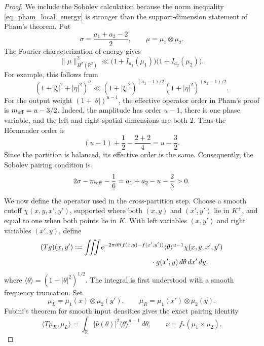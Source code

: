 \documentclass[11pt]{article}
\begin{document}
\begin{proof}
We include the Sobolev calculation because the norm inequality
\eqref{eq_pham_local_energy} is stronger than the support-dimension
statement of Pham's theorem.  Put
\[
 \sigma=\frac{a_1+a_2-2}{2},
 \qquad \mu=\mu_1\otimes\mu_2.
\]
The Fourier characterization of energy gives
\begin{equation}
 \|\mu\|_{H^\sigma(\mathbb R^2)}^2
 \ll
 \bigl(1+I_{a_1}(\mu_1)\bigr)
 \bigl(1+I_{a_2}(\mu_2)\bigr).
 \label{eq_pham_product_sobolev}
\end{equation}
For example, this follows from
\[
 (1+|\xi|^2+|\eta|^2)^\sigma
 \ll (1+|\xi|^2)^{(a_1-1)/2}
      (1+|\eta|^2)^{(a_2-1)/2}.
\]
For the output weight $(1+|\theta|)^{u-1}$, the effective operator
order in Pham's proof is $m_{\rm eff}=u-3/2$.
{Indeed, the amplitude has order \(u-1\), there is one phase
variable, and the left and right spatial dimensions are both \(2\).
Thus the H\"ormander order is
\[
 (u-1)+\frac{1}{2}-\frac{2+2}{4}=u-\frac{3}{2}.
\]
Since the partition is balanced, its effective order is the same.}
Consequently, the Sobolev pairing condition is
\begin{equation}
 2\sigma-m_{\rm eff}-\frac{1}{6}
 =a_1+a_2-u-\frac{2}{3}>0.
 \label{eq_pham_pairing_condition}
\end{equation}

We now define the operator used in the cross-partition step.  Choose
a smooth cutoff \(\chi(x,y,x',y')\), supported where both
\((x,y)\) and \((x',y')\) lie in \(K^+\), and equal to one when both
points lie in \(K\).  With left variables \((x,y')\) and right
variables \((x',y)\), define
\begin{align}
 (Tg)(x,y')
 :=\iiint &e^{-2\pi i\theta(f(x,y)-f(x',y'))}
 \langle\theta\rangle^{u-1}
 \chi(x,y,x',y')\notag\\
 &\hspace{25mm}\cdot g(x',y)\,d\theta\,dx'\,dy.
 \label{eq_pham_cross_operator}
\end{align}
where \(\langle\theta\rangle=(1+|\theta|^2)^{1/2}\).
The integral is first understood with a smooth frequency truncation.
Set
\[
 \mu_L=\mu_1(x)\otimes\mu_2(y'),
 \qquad
 \mu_R=\mu_1(x')\otimes\mu_2(y).
\]
Fubini's theorem for smooth input densities gives the exact pairing
identity
\begin{equation}
 \big\langle T\mu_R,\mu_L\big\rangle
 =\int_{\mathbb R}|\widehat\nu(\theta)|^2
 \langle\theta\rangle^{u-1}\,d\theta,
 \qquad \nu=f_*(\mu_1\times\mu_2).
 \label{eq_pham_cross_partition_pairing}
\end{equation}


\end{proof}
\end{document}

